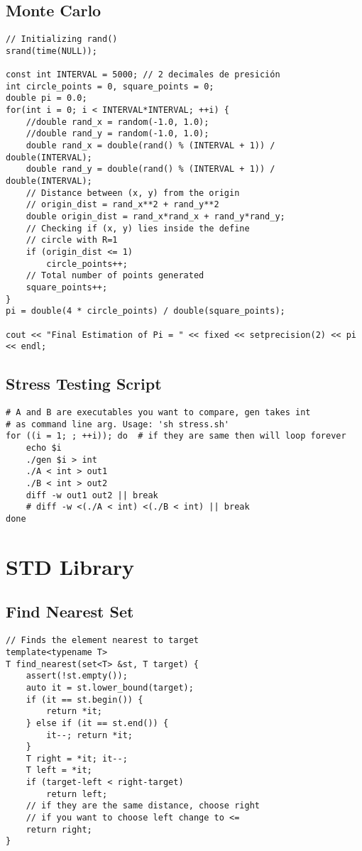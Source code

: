 \documentclass[10pt,letterpaper,twocolumn,twosided]{article}
\begin{document}
\subsection{Monte Carlo}
\begin{lstlisting}
// Initializing rand()
srand(time(NULL));

const int INTERVAL = 5000; // 2 decimales de presición
int circle_points = 0, square_points = 0;
double pi = 0.0;
for(int i = 0; i < INTERVAL*INTERVAL; ++i) {
    //double rand_x = random(-1.0, 1.0);
    //double rand_y = random(-1.0, 1.0);
    double rand_x = double(rand() % (INTERVAL + 1)) / double(INTERVAL);
    double rand_y = double(rand() % (INTERVAL + 1)) / double(INTERVAL);
    // Distance between (x, y) from the origin
    // origin_dist = rand_x**2 + rand_y**2
    double origin_dist = rand_x*rand_x + rand_y*rand_y;
    // Checking if (x, y) lies inside the define
    // circle with R=1
    if (origin_dist <= 1)
        circle_points++;
    // Total number of points generated
    square_points++;    
}
pi = double(4 * circle_points) / double(square_points);

cout << "Final Estimation of Pi = " << fixed << setprecision(2) << pi << endl;
\end{lstlisting}

\subsection{Stress Testing Script}
\begin{lstlisting}
# A and B are executables you want to compare, gen takes int
# as command line arg. Usage: 'sh stress.sh'
for ((i = 1; ; ++i)); do  # if they are same then will loop forever
    echo $i
    ./gen $i > int
    ./A < int > out1
    ./B < int > out2
    diff -w out1 out2 || break
    # diff -w <(./A < int) <(./B < int) || break
done
\end{lstlisting}


\section{STD Library}

\subsection{Find Nearest Set}
\begin{lstlisting}
// Finds the element nearest to target
template<typename T>
T find_nearest(set<T> &st, T target) {
    assert(!st.empty());
    auto it = st.lower_bound(target);
    if (it == st.begin()) {
        return *it;
    } else if (it == st.end()) {
        it--; return *it;
    }
    T right = *it; it--;
    T left = *it;
    if (target-left < right-target) 
        return left;
    // if they are the same distance, choose right
    // if you want to choose left change to <=
    return right;
}
\end{lstlisting}
\end{document}
